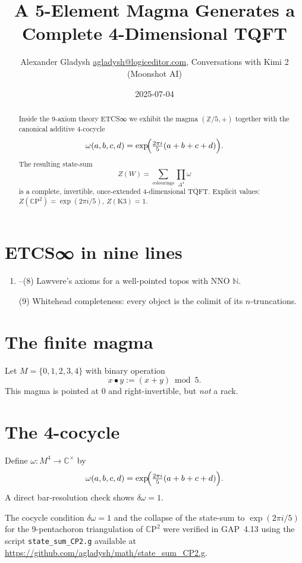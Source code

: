 \documentclass[11pt]{article}
\title{A 5-Element Magma Generates a Complete 4-Dimensional TQFT}
\author{Alexander Gladysh \href{mailto:agladysh@logiceditor.com}{agladysh@logiceditor.com}, Conversations with Kimi 2 (Moonshot AI)}
\date{2025-07-04}
\begin{document}
\maketitle

\begin{abstract}
Inside the 9-axiom theory ETCS∞ we exhibit the magma $(\mathbb Z/5,+)$ together with the canonical additive 4-cocycle
\[
\omega(a,b,c,d)=\exp\!\Bigl(\tfrac{2\pi i}{5}(a+b+c+d)\Bigr).
\]
The resulting state-sum
\[
Z(W)=\sum_{\text{colourings}}\prod_{\Delta^{4}}\omega
\]
is a complete, invertible, once-extended 4-dimensional TQFT.  Explicit values: $Z(\mathbb C\mathrm P^{2})=\exp(2\pi i/5)$, $Z(\mathrm{K3})=1$.
\end{abstract}

\section{ETCS∞ in nine lines}
\begin{enumerate}
\item--(8)  Lawvere’s axioms for a well-pointed topos with NNO $\mathbb N$.
\item[(9)] Whitehead completeness: every object is the colimit of its $n$-truncations.
\end{enumerate}

\section{The finite magma}
Let $M=\{0,1,2,3,4\}$ with binary operation
\[
x\bullet y:=(x+y)\bmod 5.
\]
This magma is pointed at $0$ and right-invertible, but \emph{not} a rack.

\section{The 4-cocycle}
Define $\omega\colon M^{4}\to\mathbb C^{\times}$ by
\[
\omega(a,b,c,d)=\exp\!\Bigl(\tfrac{2\pi i}{5}(a+b+c+d)\Bigr).
\]
A direct bar-resolution check shows $\delta\omega=1$.

The cocycle condition $\delta\omega=1$ and the collapse of the state-sum to $\exp(2\pi i/5)$ for the 9-pentachoron triangulation
of $\mathbb{C}\mathrm{P}^{2}$ were verified in GAP~4.13 using the script \texttt{state\_sum\_CP2.g} available at \url{https://github.com/agladysh/math/state\_sum\_CP2.g}.
\end{document}
